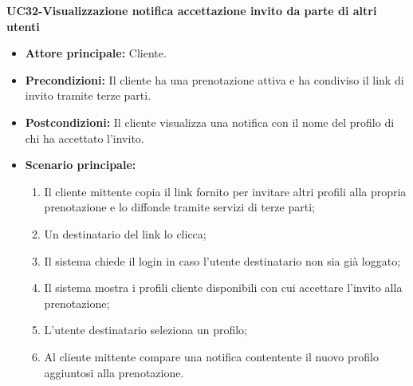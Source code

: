 \textbf{UC32-Visualizzazione notifica accettazione invito da parte di altri utenti}
\begin{itemize}
\item \textbf{Attore principale:} Cliente.
\item \textbf{Precondizioni:} Il cliente ha una prenotazione attiva e ha condiviso il link di invito tramite terze parti.
\item \textbf{Postcondizioni:} Il cliente visualizza una notifica con il nome del profilo di chi ha accettato l'invito.
\item \textbf{Scenario principale:}
\begin{enumerate}
    \item Il cliente mittente copia il link fornito per invitare altri profili alla propria prenotazione e lo diffonde tramite
      servizi di terze parti;
    \item Un destinatario del link lo clicca;
    \item Il sistema chiede il login in caso l'utente destinatario non sia già loggato;
    \item Il sistema mostra i profili cliente disponibili con cui accettare l'invito alla prenotazione;
    \item L'utente destinatario seleziona un profilo;
    \item Al cliente mittente compare una notifica contentente il nuovo profilo aggiuntosi alla prenotazione.
\end{enumerate}
\end{itemize}

